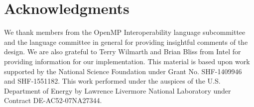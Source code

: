 \documentclass{llncs}
\newcommand{\othertm}{\textsuperscript{$\star$}}
\begin{document}
\section*{Acknowledgments}
We thank members from the OpenMP Interoperability language subcommittee and the language 
committee in general for providing insightful comments of the design. 
We are also grateful to Terry Wilmarth and Brian Bliss from Intel for providing information for our 
implementation. 
This material is based upon work supported by the National
Science Foundation under Grant No. SHF-1409946 and SHF-1551182. 
This work performed under the auspices of the U.S. Department of Energy by Lawrence Livermore National Laboratory under Contract DE-AC52-07NA27344.
%

\small{


}
\end{document}
